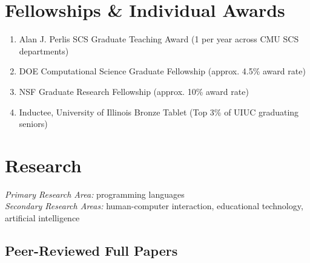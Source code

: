 \documentclass[10pt,letterpaper]{article}
\begin{document}
  \section*{Fellowships \& Individual Awards}
\begin{enumerate}
  \item {Alan J. Perlis SCS Graduate Teaching Award} (1 per year across CMU SCS departments)%
  \item DOE Computational Science Graduate Fellowship (approx. 4.5\% award rate)
  \item NSF Graduate Research Fellowship (approx. 10\% award rate)
  \item Inductee, University of Illinois Bronze Tablet (Top 3\% of UIUC graduating seniors)
\end{enumerate}

\section*{Research}

\textit{Primary Research Area:} programming languages \\
\textit{Secondary Research Areas:} human-computer interaction, educational technology, artificial intelligence

\subsection*{Peer-Reviewed Full Papers}
\end{document}
